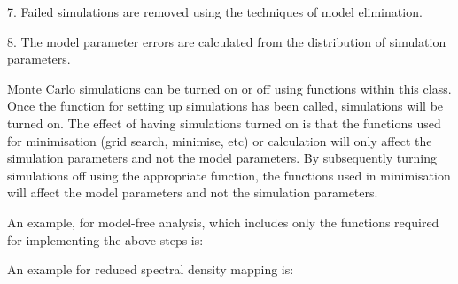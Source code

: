  7.  Failed simulations are removed using the techniques of model elimination. 
  

 8.  The model parameter errors are calculated from the distribution of simulation parameters. 
  

 Monte Carlo simulations can be turned on or off using functions within this class.  Once the function for setting up simulations has been called, simulations will be turned on.  The effect of having simulations turned on is that the functions used for minimisation (grid search, minimise, etc) or calculation will only affect the simulation parameters and not the model parameters.  By subsequently turning simulations off using the appropriate function, the functions used in minimisation will affect the model parameters and not the simulation parameters. 
  

 An example, for model-free analysis, which includes only the functions required for implementing the above steps is: 
  









 An example for reduced spectral density mapping is: 
  




